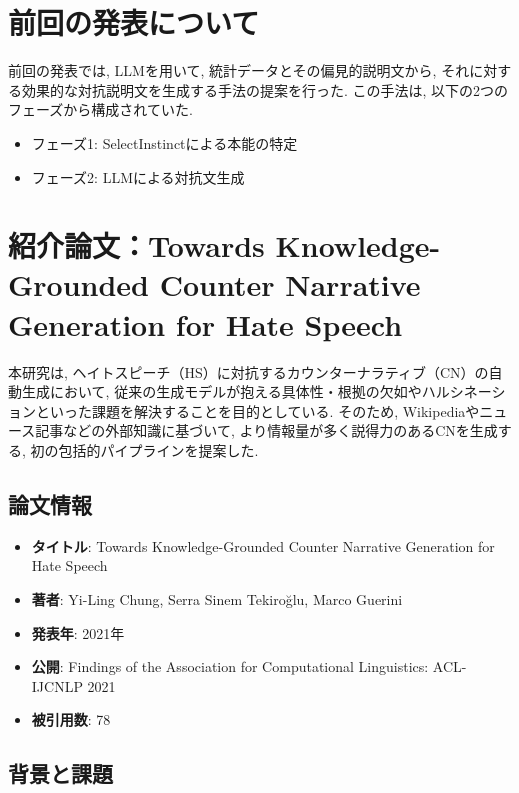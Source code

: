 \documentclass[dvipdfmx]{jsarticle}
\begin{document}
\section{前回の発表について}

前回の発表では, LLMを用いて, 統計データとその偏見的説明文から, それに対する効果的な対抗説明文を生成する手法の提案を行った.
この手法は, 以下の2つのフェーズから構成されていた.

\begin{itemize}
  \item フェーズ1: SelectInstinctによる本能の特定
  \item フェーズ2: LLMによる対抗文生成
\end{itemize}

\vspace{1em}

\section{紹介論文：Towards Knowledge-Grounded Counter Narrative Generation for Hate Speech \cite{chung2021}}

本研究は, ヘイトスピーチ（HS）に対抗するカウンターナラティブ（CN）の自動生成において, 従来の生成モデルが抱える具体性・根拠の欠如やハルシネーションといった課題を解決することを目的としている.
そのため, Wikipediaやニュース記事などの外部知識に基づいて, より情報量が多く説得力のあるCNを生成する, 初の包括的パイプラインを提案した.

\subsection{論文情報}
\begin{itemize}
  \item \textbf{タイトル}: Towards Knowledge-Grounded Counter Narrative Generation for Hate Speech
  \item \textbf{著者}: Yi-Ling Chung, Serra Sinem Tekiroğlu, Marco Guerini
  \item \textbf{発表年}: 2021年
  \item \textbf{公開}: Findings of the Association for Computational Linguistics: ACL-IJCNLP 2021
  \item \textbf{被引用数}: 78
\end{itemize}

\vspace{0.5em}

\subsection{背景と課題}
\end{document}
